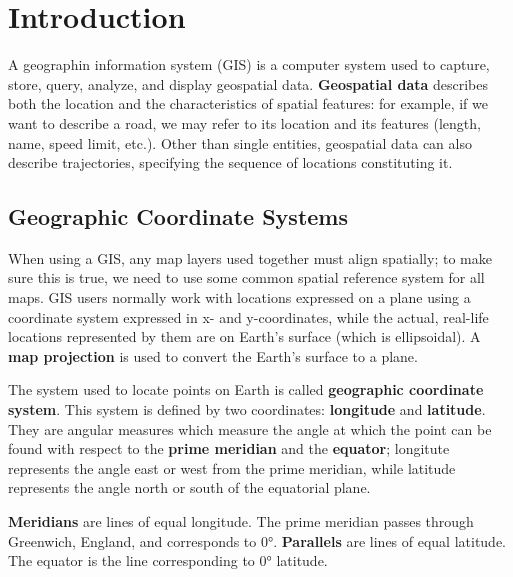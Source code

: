 \chapter{Introduction}

A geographin information system (GIS) is a computer system used to capture, store, query, analyze, and display geospatial data. \textbf{Geospatial data} describes both the location and the characteristics of spatial features: for example, if we want to describe a road, we may refer to its location and its features (length, name, speed limit, etc.). Other than single entities, geospatial data can also describe trajectories, specifying the sequence of locations constituting it.

\section{Geographic Coordinate Systems}

When using a GIS, any map layers used together must align spatially; to make sure this is true, we need to use some common spatial reference system for all maps. GIS users normally work with locations expressed on a plane using a coordinate system expressed in x- and y-coordinates, while the actual, real-life locations represented by them are on Earth's surface (which is ellipsoidal). A \textbf{map projection} is used to convert the Earth's surface to a plane.

The system used to locate points on Earth is called \textbf{geographic coordinate system}. This system is defined by two coordinates: \textbf{longitude} and \textbf{latitude}. They are angular measures which measure the angle at which the point can be found with respect to the \textbf{prime meridian} and the \textbf{equator}; longitute represents the angle east or west from the prime meridian, while latitude represents the angle north or south of the equatorial plane.

\textbf{Meridians} are lines of equal longitude. The prime meridian passes through Greenwich, England, and corresponds to 0°. \textbf{Parallels} are lines of equal latitude. The equator is the line corresponding to 0° latitude.

